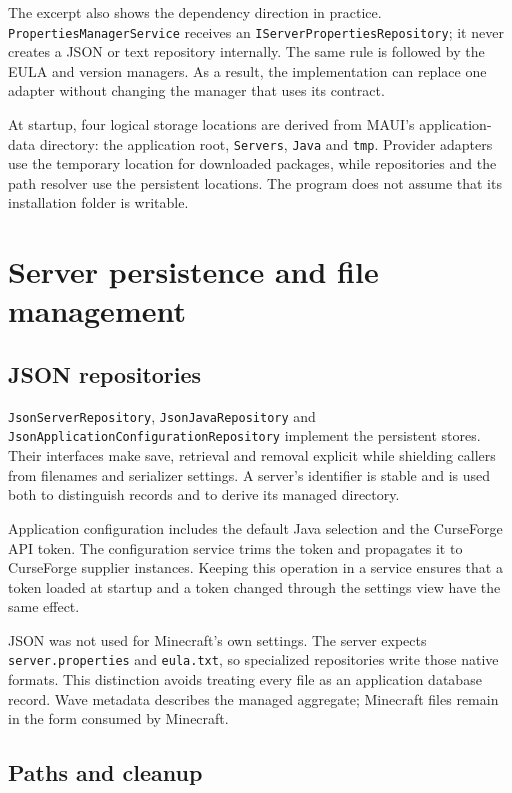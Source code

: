 The excerpt also shows the dependency direction in practice. \texttt{PropertiesManagerService} receives an \texttt{IServerPropertiesRepository}; it never creates a JSON or text repository internally. The same rule is followed by the EULA and version managers. As a result, the implementation can replace one adapter without changing the manager that uses its contract.

At startup, four logical storage locations are derived from MAUI's application-data directory: the application root, \texttt{Servers}, \texttt{Java} and \texttt{tmp}. Provider adapters use the temporary location for downloaded packages, while repositories and the path resolver use the persistent locations. The program does not assume that its installation folder is writable.

\section{Server persistence and file management}

\subsection{JSON repositories}

\texttt{JsonServerRepository}, \texttt{JsonJavaRepository} and \texttt{JsonApplicationConfigurationRepository} implement the persistent stores. Their interfaces make save, retrieval and removal explicit while shielding callers from filenames and serializer settings. A server's identifier is stable and is used both to distinguish records and to derive its managed directory.

Application configuration includes the default Java selection and the CurseForge API token. The configuration service trims the token and propagates it to CurseForge supplier instances. Keeping this operation in a service ensures that a token loaded at startup and a token changed through the settings view have the same effect.

JSON was not used for Minecraft's own settings. The server expects \texttt{server.properties} and \texttt{eula.txt}, so specialized repositories write those native formats. This distinction avoids treating every file as an application database record. Wave metadata describes the managed aggregate; Minecraft files remain in the form consumed by Minecraft.

\subsection{Paths and cleanup}

